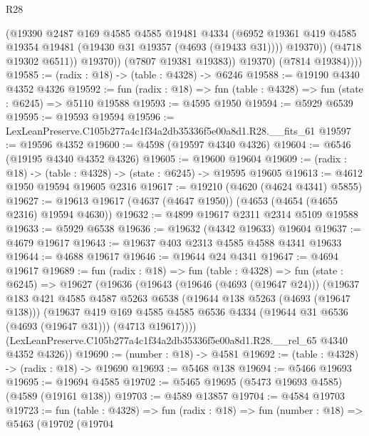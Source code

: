 \begin{lexlean}{R28}
\begin{coremodule}
                      (@19390
                        @2487
                        @169
                        @4585
                        @4585
                        @19481
                        @4334
                        (@6952
                          @19361
                          @419
                          @4585
                          @19354
                          @19481
                          (@19430 @31 @19357 (@4693 (@19433 @31))))
                        @19370))
                    (@4718 @19302 @6511))
                  @19370))
              (@7807 @19381 @19383))
            @19370)
          (@7814 @19384))))
@19585 := (radix : @18) -> (table : @4328) -> @6246
@19588 := @19190 @4340 @4352 @4326
@19592 := fun (radix : @18) => fun (table : @4328) => fun (state : @6245) => @5110 @19588
@19593 := @4595 @1950
@19594 := @5929 @6539
@19595 := @19593 @19594
@19596 := LexLeanPreserve.C105b277a4c1f34a2db35336f5e00a8d1.R28.__fits_61
@19597 := @19596 @4352
@19600 := @4598 (@19597 @4340 @4326)
@19604 := @6546 (@19195 @4340 @4352 @4326)
@19605 := @19600 @19604
@19609 := (radix : @18) -> (table : @4328) -> (state : @6245) -> @19595 @19605
@19613 := @4612 @1950 @19594 @19605 @2316
@19617 := @19210 (@4620 (@4624 @4341) @5855)
@19627 := @19613 @19617 (@4637 (@4647 @1950)) (@4653 (@4654 (@4655 @2316) @19594 @4630))
@19632 := @4899 @19617 @2311 @2314 @5109 @19588
@19633 := @5929 @6538
@19636 := @19632 (@4342 @19633) @19604
@19637 := @4679 @19617
@19643 := @19637 @403 @2313 @4585 @4588 @4341 @19633
@19644 := @4688 @19617
@19646 := @19644 @24 @4341
@19647 := @4694 @19617
@19689 := fun (radix : @18) =>
  fun (table : @4328) =>
  fun (state : @6245) =>
  @19627
    (@19636
      (@19643
        (@19646 (@4693 (@19647 @24)))
        (@19637
          @183
          @421
          @4585
          @4587
          @5263
          @6538
          (@19644 @138 @5263 (@4693 (@19647 @138)))
          (@19637
            @419
            @169
            @4585
            @4585
            @6536
            @4334
            (@19644 @31 @6536 (@4693 (@19647 @31)))
            (@4713 @19617))))
      (LexLeanPreserve.C105b277a4c1f34a2db35336f5e00a8d1.R28.__rel_65 @4340 @4352 @4326))
@19690 := (number : @18) -> @4581
@19692 := (table : @4328) -> (radix : @18) -> @19690
@19693 := @5468 @138
@19694 := @5466 @19693
@19695 := @19694 @4585
@19702 := @5465 @19695 (@5473 @19693 @4585) (@4589 (@19161 @138))
@19703 := @4589 @13857
@19704 := @4584 @19703
@19723 := fun (table : @4328) =>
  fun (radix : @18) =>
  fun (number : @18) =>
  @5463
    (@19702
      (@19704

\end{coremodule}
\end{lexlean}
